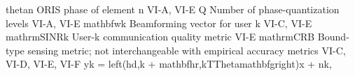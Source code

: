 {}\markdownRendererPipe{} \markdownRendererDollarSign{}\markdownRendererBackslash{}theta\markdownRendererUnderscore{}n\markdownRendererDollarSign{} \markdownRendererPipe{} ORIS phase of element \markdownRendererDollarSign{}n\markdownRendererDollarSign{} \markdownRendererPipe{} VI-A, VI-E \markdownRendererPipe{}\markdownRendererSoftLineBreak
{}\markdownRendererPipe{} \markdownRendererDollarSign{}Q\markdownRendererDollarSign{} \markdownRendererPipe{} Number of phase-quantization levels \markdownRendererPipe{} VI-A, VI-E \markdownRendererPipe{}\markdownRendererSoftLineBreak
{}\markdownRendererPipe{} \markdownRendererDollarSign{}\markdownRendererBackslash{}mathbf\markdownRendererLeftBrace{}w\markdownRendererRightBrace{}\markdownRendererUnderscore{}k\markdownRendererDollarSign{} \markdownRendererPipe{} Beamforming vector for user \markdownRendererDollarSign{}k\markdownRendererDollarSign{} \markdownRendererPipe{} VI-C, VI-E \markdownRendererPipe{}\markdownRendererSoftLineBreak
{}\markdownRendererPipe{} \markdownRendererDollarSign{}\markdownRendererBackslash{}mathrm\markdownRendererLeftBrace{}SINR\markdownRendererRightBrace{}\markdownRendererUnderscore{}k\markdownRendererDollarSign{} \markdownRendererPipe{} User-\markdownRendererDollarSign{}k\markdownRendererDollarSign{} communication quality metric \markdownRendererPipe{} VI-E \markdownRendererPipe{}\markdownRendererSoftLineBreak
{}\markdownRendererPipe{} \markdownRendererDollarSign{}\markdownRendererBackslash{}mathrm\markdownRendererLeftBrace{}CRB\markdownRendererRightBrace{}\markdownRendererDollarSign{} \markdownRendererPipe{} Bound-type sensing metric; not interchangeable with empirical accuracy metrics \markdownRendererPipe{} VI-C, VI-D, VI-E, VI-F \markdownRendererPipe{}\markdownRendererInterblockSeparator
{}\markdownRendererBlockQuoteBegin
{}\markdownRendererParagraphSeparator
{}\markdownRendererDollarSign{}\markdownRendererDollarSign{}\markdownRendererSoftLineBreak
{}y\markdownRendererUnderscore{}k = \markdownRendererBackslash{}left(h\markdownRendererUnderscore{}\markdownRendererLeftBrace{}d,k\markdownRendererRightBrace{} + \markdownRendererBackslash{}mathbf\markdownRendererLeftBrace{}h\markdownRendererRightBrace{}\markdownRendererUnderscore{}\markdownRendererLeftBrace{}r,k\markdownRendererRightBrace{}\markdownRendererCircumflex{}\markdownRendererLeftBrace{}T\markdownRendererRightBrace{}\markdownRendererBackslash{}Theta\markdownRendererBackslash{}mathbf\markdownRendererLeftBrace{}g\markdownRendererRightBrace{}\markdownRendererBackslash{}right)x + n\markdownRendererUnderscore{}k,\markdownRendererSoftLineBreak
